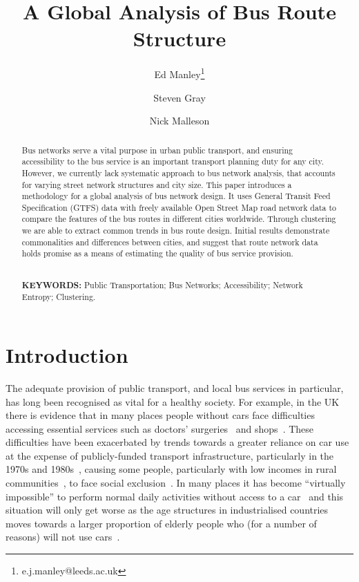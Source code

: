 \documentclass[11pt]{article}
\title{A Global Analysis of Bus Route Structure}
\author[1,2]{Ed Manley\thanks{e.j.manley@leeds.ac.uk}}
\author[3]{Steven Gray}
\author[1,2]{Nick Malleson}
\affil[1]{School of Geography, University of Leeds}
\affil[2]{Leeds Institute for Data Analytics, University of Leeds}
\affil[3]{Centre for Advanced Spatial Analysis (CASA), University College London}
\begin{document}
\maketitle


\begin{abstract}
\centering

Bus networks serve a vital purpose in urban public transport, and ensuring accessibility to the bus service is an important transport planning duty for any city. However, we currently lack systematic approach to bus network analysis, that accounts for varying street network structures and city size. This paper introduces a methodology for a global analysis of bus network design. It uses General Transit Feed Specification (GTFS) data with freely available Open Street Map road network data to compare the features of the bus routes in different cities worldwide. Through clustering we are able to extract common trends in bus route design. Initial results demonstrate commonalities and differences between cities, and suggest that route network data holds promise as a means of estimating the quality of bus service provision.

$ $ \\ {\bf KEYWORDS:} Public Transportation; Bus Networks; Accessibility; Network Entropy; Clustering.

\end{abstract}


\section{Introduction}

The adequate provision of public transport, and local bus services in particular, has long been recognised as vital for a healthy society. For example, in the UK there is evidence that in many places people without cars face difficulties accessing essential services such as doctors' surgeries~\citep{lovett_car_2002} and shops~\citep{guy_food_2004, lucas_providing_2006}. These difficulties have been exacerbated by trends towards a greater reliance on car use at the expense of publicly-funded transport infrastructure, particularly in the 1970s and 1980s~\citep{higgs_changes_1997}, causing some people, particularly with low incomes in rural communities~\citep{lowe_deprivation_1986}, to face social exclusion~\citep{pooley_mobility_2016}.  In many places it has become ``virtually impossible'' to perform normal daily activities without access to a car~\citep{lucas_transport_2001} and this situation will only get worse as the age structures in industrialised countries moves towards a larger proportion of elderly people who (for a number of reasons) will not use cars~\citep{lucas_providing_2006}.
\end{document}

